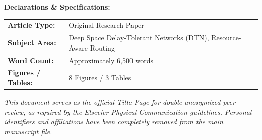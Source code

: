 \documentclass[11pt]{article}
\begin{document}
\vspace*{0.4in}

{\large\bfseries Declarations \& Specifications:}\\[0.15in]
\begin{tabular}{ll}
    \textbf{Article Type:} & Original Research Paper \\
    \textbf{Subject Area:} & Deep Space Delay-Tolerant Networks (DTN), Resource-Aware Routing \\
    \textbf{Word Count:} & Approximately 6,500 words \\
    \textbf{Figures / Tables:} & 8 Figures / 3 Tables \\
\end{tabular}

\vspace*{0.5in}
\vfill

\begin{center}
    {\footnotesize \textit{This document serves as the official Title Page for double-anonymized peer review, as required by the Elsevier Physical Communication guidelines. Personal identifiers and affiliations have been completely removed from the main manuscript file.}}
\end{center}
\end{document}

